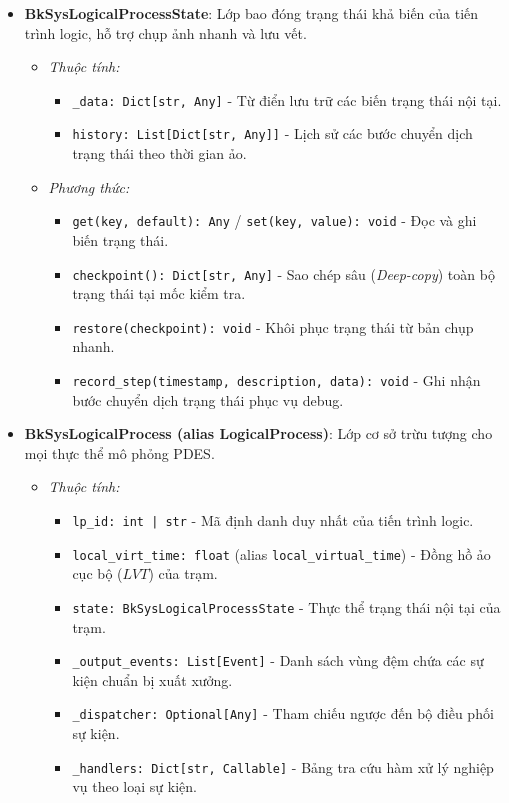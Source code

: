 \begin{itemize}[leftmargin=1.5em, itemsep=8pt]
\item \textbf{BkSysLogicalProcessState}: Lớp bao đóng trạng thái khả biến của tiến trình logic, hỗ trợ chụp ảnh nhanh và lưu vết.

\begin{itemize}[leftmargin=1.2em, label={}, itemsep=3pt]
\item[\textendash] \textit{Thuộc tính:}
\begin{itemize}[leftmargin=1.5em, label=+, itemsep=2pt]
\item \texttt{\_data: Dict[str, Any]} - Từ điển lưu trữ các biến trạng thái nội tại.
\item \texttt{history: List[Dict[str, Any]]} - Lịch sử các bước chuyển dịch trạng thái theo thời gian ảo.
\end{itemize}

\item[\textendash] \textit{Phương thức:}
\begin{itemize}[leftmargin=1.5em, label=+, itemsep=2pt]
\item \texttt{get(key, default): Any} / \texttt{set(key, value): void} - Đọc và ghi biến trạng thái.
\item \texttt{checkpoint(): Dict[str, Any]} - Sao chép sâu (\textit{Deep-copy}) toàn bộ trạng thái tại mốc kiểm tra.
\item \texttt{restore(checkpoint): void} - Khôi phục trạng thái từ bản chụp nhanh.
\item \texttt{record\_step(timestamp, description, data): void} - Ghi nhận bước chuyển dịch trạng thái phục vụ debug.
\end{itemize}
\end{itemize}

\item \textbf{BkSysLogicalProcess (alias LogicalProcess)}: Lớp cơ sở trừu tượng cho mọi thực thể mô phỏng PDES.

\begin{itemize}[leftmargin=1.2em, label={}, itemsep=3pt]
\item[\textendash] \textit{Thuộc tính:}
\begin{itemize}[leftmargin=1.5em, label=+, itemsep=2pt]
\item \texttt{lp\_id: int | str} - Mã định danh duy nhất của tiến trình logic.
\item \texttt{local\_virt\_time: float} (alias \texttt{local\_virtual\_time}) - Đồng hồ ảo cục bộ ($LVT$) của trạm.
\item \texttt{state: BkSysLogicalProcessState} - Thực thể trạng thái nội tại của trạm.
\item \texttt{\_output\_events: List[Event]} - Danh sách vùng đệm chứa các sự kiện chuẩn bị xuất xưởng.
\item \texttt{\_dispatcher: Optional[Any]} - Tham chiếu ngược đến bộ điều phối sự kiện.
\item \texttt{\_handlers: Dict[str, Callable]} - Bảng tra cứu hàm xử lý nghiệp vụ theo loại sự kiện.
\end{itemize}


\end{itemize}
\end{itemize}
